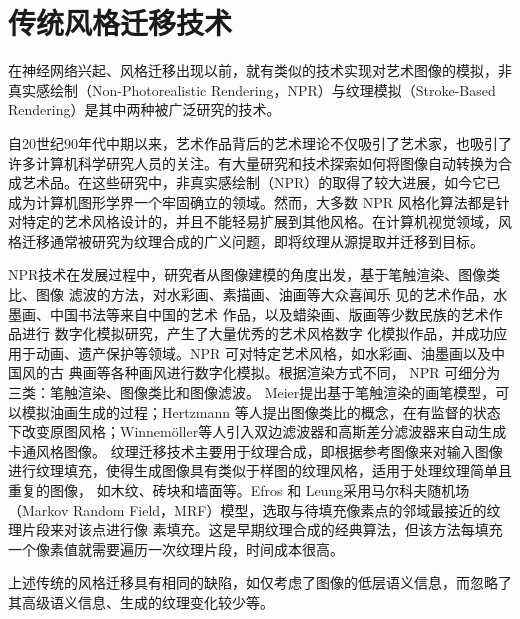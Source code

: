 \section{传统风格迁移技术}

在神经网络兴起、风格迁移出现以前，就有类似的技术实现对艺术图像的模拟，非真实感绘制（Non-Photorealistic Rendering，NPR）与纹理模拟（Stroke-Based Rendering）是其中两种被广泛研究的技术。

自20世纪90年代中期以来，艺术作品背后的艺术理论不仅吸引了艺术家，也吸引了许多计算机科学研究人员的关注。有大量研究和技术探索如何将图像自动转换为合成艺术品。在这些研究中，非真实感绘制（NPR）的取得了较大进展，如今它已成为计算机图形学界一个牢固确立的领域。然而，大多数 NPR 风格化算法都是针对特定的艺术风格设计的，并且不能轻易扩展到其他风格。在计算机视觉领域，风格迁移通常被研究为纹理合成的广义问题，即将纹理从源提取并迁移到目标。 \cite{QianWenHuaFeiZhenShiGanHuiZhiJiShuYanJiuXianZhuangYuZhanWang2020}

NPR技术在发展过程中，研究者从图像建模的角度出发，基于笔触渲染、图像类比、图像 滤波的方法，对水彩画、素描画、油画等大众喜闻乐 见的艺术作品，水墨画、中国书法等来自中国的艺术 作品，以及蜡染画、版画等少数民族的艺术作品进行 数字化模拟研究，产生了大量优秀的艺术风格数字 化模拟作品，并成功应用于动画、遗产保护等领域。NPR 可对特定艺术风格，如水彩画、油墨画以及中国风的古 典画等各种画风进行数字化模拟。根据渲染方式不同， NPR 可细分为三类：笔触渲染、图像类比和图像滤波。 Meier\cite{meierPainterlyRenderingAnimation1996}提出基于笔触渲染的画笔模型，可以模拟油画生成的过程；Hertzmann 等人\cite{hertzmannImageAnalogies2023}提出图像类比的概念，在有监督的状态下改变原图风格；Winnemöller等人\cite{winnemollerRealtimeVideoAbstraction2006}引入双边滤波器和高斯差分滤波器来自动生成卡通风格图像。 纹理迁移技术主要用于纹理合成，即根据参考图像来对输入图像进行纹理填充，使得生成图像具有类似于样图的纹理风格，适用于处理纹理简单且重复的图像， 如木纹、砖块和墙面等。Efros 和 Leung\cite{efrosTextureSynthesisNonparametric1999}采用马尔科夫随机场（Markov Random Field，MRF）模型，选取与待填充像素点的邻域最接近的纹理片段来对该点进行像 素填充。这是早期纹理合成的经典算法，但该方法每填充一个像素值就需要遍历一次纹理片段，时间成本很高。\cite{TangRenWeiShenJingFengGeQianYiMoXingZongShu2021}

上述传统的风格迁移具有相同的缺陷，如仅考虑了图像的低层语义信息，而忽略了其高级语义信息、生成的纹理变化较少等。